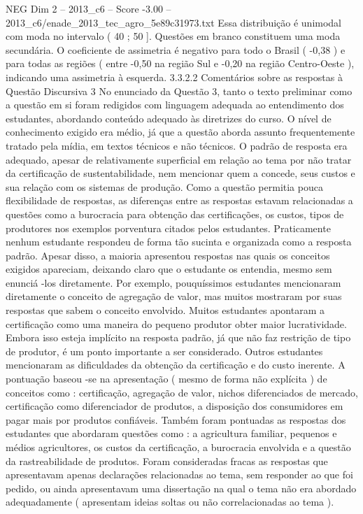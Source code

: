\begin{textsample}{NEG Dim 2 – 2013\_c6 – Score -3.00 – 2013\_c6/enade\_2013\_tec\_agro\_5e89c31973.txt}
Essa distribuição é unimodal com moda no intervalo ( 40 ; 50 ].
Questões em branco constituem uma moda secundária.
O coeficiente de assimetria é negativo para todo o Brasil ( -0,38 ) e para todas as regiões ( entre -0,50 na região Sul e -0,20 na região Centro-Oeste ), indicando uma assimetria à esquerda. 3.3.2.2 Comentários sobre as respostas à Questão Discursiva 3 No enunciado da Questão 3, tanto o texto preliminar como a questão em si foram redigidos com linguagem adequada ao entendimento dos estudantes, abordando conteúdo adequado às diretrizes do curso.
O nível de conhecimento exigido era médio, já que a questão aborda assunto frequentemente tratado pela mídia, em textos técnicos e não técnicos.
O padrão de resposta era adequado, apesar de relativamente superficial em relação ao tema por não tratar da certificação de sustentabilidade, nem mencionar quem a concede, seus custos e sua relação com os sistemas de produção.
Como a questão permitia pouca flexibilidade de respostas, as diferenças entre as respostas estavam relacionadas a questões como a burocracia para obtenção das certificações, os custos, tipos de produtores nos exemplos porventura citados pelos estudantes.
Praticamente nenhum estudante respondeu de forma tão sucinta e organizada como a resposta padrão.
Apesar disso, a maioria apresentou respostas nas quais os conceitos exigidos apareciam, deixando claro que o estudante os entendia, mesmo sem enunciá -los diretamente.
Por exemplo, pouquíssimos estudantes mencionaram diretamente o conceito de agregação de valor, mas muitos mostraram por suas respostas que sabem o conceito envolvido.
Muitos estudantes apontaram a certificação como uma maneira do pequeno produtor obter maior lucratividade.
Embora isso esteja implícito na resposta padrão, já que não faz restrição de tipo de produtor, é um ponto importante a ser considerado.
Outros estudantes mencionaram as dificuldades da obtenção da certificação e do custo inerente.
A pontuação baseou -se na apresentação ( mesmo de forma não explícita ) de conceitos como : certificação, agregação de valor, nichos diferenciados de mercado, certificação como diferenciador de produtos, a disposição dos consumidores em pagar mais por produtos confiáveis.
Também foram pontuadas as respostas dos estudantes que abordaram questões como : a agricultura familiar, pequenos e médios agricultores, os custos da certificação, a burocracia envolvida e a questão da rastreabilidade de produtos.
Foram consideradas fracas as respostas que apresentavam apenas declarações relacionadas ao tema, sem responder ao que foi pedido, ou ainda apresentavam uma dissertação na qual o tema não era abordado adequadamente ( apresentam ideias soltas ou não correlacionadas ao tema ).

\end{textsample}
